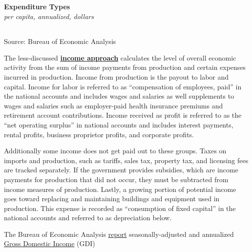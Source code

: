 \documentclass{report}
\begin{document}
\begin{minipage}{0.77\textwidth}
\normalsize \textbf{Expenditure Types}\\
\footnotesize{\textit{per capita, annualized, dollars}}\\
\hspace{-2mm}  \setlength{\tabcolsep}{3.7pt} \color{black!90}
		{\renewcommand{\arraystretch}{1.55}
		 \begin{tabular}{p{53mm} R{13mm} R{13mm} R{13mm} R{13mm}}
			 \hline
		\end{tabular}} \vspace{-2mm}
		
\footnotesize{Source: Bureau of Economic Analysis}
\end{minipage}
\newpage
\begin{minipage}{0.76\textwidth}
\small The less-discussed \textbf{\href{https://www.bea.gov/help/glossary/income-approach}{income approach}} calculates the level of overall economic activity from the sum of income payments from production and certain expenses incurred in production. Income from production is the payout to labor and capital. Income for labor is referred to as ``compensation of employees, paid'' in the national accounts and includes wages and salaries as well supplements to wages and salaries such as employer-paid health insurance premiums and retirement account contributions. Income received as profit is referred to as the ``net operating surplus'' in national accounts and includes interest payments, rental profits, business proprietor profits, and corporate profits.

Additionally some income does not get paid out to these groups. Taxes on imports and production, such as tariffs, sales tax, property tax, and licensing fees are tracked separately. If the government provides subsidies, which are income payments for production that did not occur, they must be subtracted from income measures of production. Lastly, a growing portion of potential income goes toward replacing and maintaining buildings and equipment used in production. This expense is recorded as ``consumption of fixed capital'' in the national accounts and referred to as depreciation below.

The Bureau of Economic Analysis \href{https://www.bea.gov/data/gdp/gross-domestic-product}{report} seasonally-adjusted and annualized \href{https://www.bea.gov/help/glossary/gross-domestic-income-gdi}{Gross Domestic Income} (GDI) 
\end{minipage}
\vspace{1mm}
\end{document}
